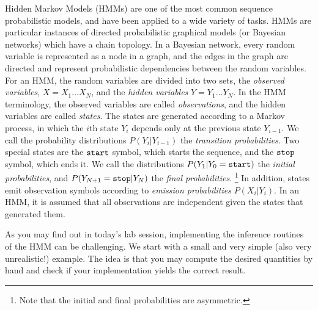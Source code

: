
Hidden Markov Models (HMMs) are one of the most common sequence
probabilistic models, and have been applied to a wide variety of
tasks. HMMs are particular instances of directed probabilistic graphical models (or Bayesian networks) which have a chain topology. 
In a
Bayesian network, every random variable is represented as a node in a
graph, and the edges in the graph are directed and represent
probabilistic dependencies between the random variables. For an HMM, the random variables are divided into two sets, the 
\emph{observed variables}, $X = X_1\ldots X_N$, 
and the \emph{hidden variables} $Y = Y_1\ldots Y_N$.
In the HMM
terminology, the observed variables are called \emph{observations}, and the
hidden variables are called \emph{states}. 
The states are generated according to a Markov process, in which the $i$th state $Y_i$ depends only 
at the previous state $Y_{i-1}$. 
We call the probability distributions 
$P(Y_{i}|Y_{i-1})$ the \emph{transition probabilities}.
Two special states are the ${\tt start}$ symbol,
which starts the sequence, and 
the ${\tt stop}$ symbol, which ends it. 
We call the distributions 
$P(Y_{1}|Y_{0} = {\tt start})$ the \emph{initial probabilities}, and 
$P(Y_{N+1}={\tt stop} |Y_{N})$ the \emph{final probabilities}.%
\footnote{Note that the initial and final probabilities 
are asymmetric.} %
In addition, states emit observation symbols according to
\emph{emission probabilities}
$P(X_i|Y_i)$. In an HMM, it is assumed that all
observations are independent given the states
that generated them.


As you may find out in today's lab session, 
implementing the inference routines of the HMM can be challenging. We start with a small and very
simple (also very unrealistic!) example. The idea is that you may compute the desired
quantities by hand and check if your implementation yields the correct result. 

